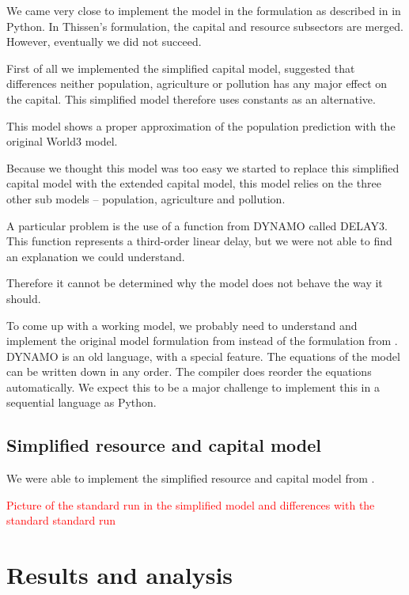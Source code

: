 \documentclass[10pt,a4paper]{scrartcl}
\begin{document}
We came very close to implement the model in the formulation as described in \cite{thissen1978investigations} in Python. In Thissen's formulation, the capital and resource subsectors are merged. However, eventually we did not succeed.

First of all we implemented the simplified capital model, \cite{thissen1978investigations} suggested that  differences neither population, agriculture or pollution has any major effect on the capital. This simplified model therefore uses constants as an alternative.

This model shows a proper approximation of the population prediction with the original World3 model.

Because we thought this model was too easy we started to replace this simplified capital model with the extended capital model, this model relies on the three other sub models – population, agriculture and pollution.

A particular problem is the use of a function from DYNAMO called DELAY3. This function represents a third-order linear delay, but we were not able to find an explanation we could understand.

Therefore it cannot be determined why the model does not behave the way it should.

To come up with a working model, we probably need to understand and implement the original model formulation from \cite{forresterworld} instead of the formulation from \cite{thissen1978investigations}. DYNAMO is an old language, with a special feature. The equations of the model can be written down in any order. The compiler does reorder the equations automatically. We expect this to be a major challenge to implement this in a sequential language as Python.

\subsection*{Simplified resource and capital model}

We were able to implement the simplified resource and capital model from \cite{thissen1978investigations}.

\textcolor{red}{Picture of the standard run in the simplified model and differences with the standard standard run}

\section*{Results and analysis}
\end{document}
